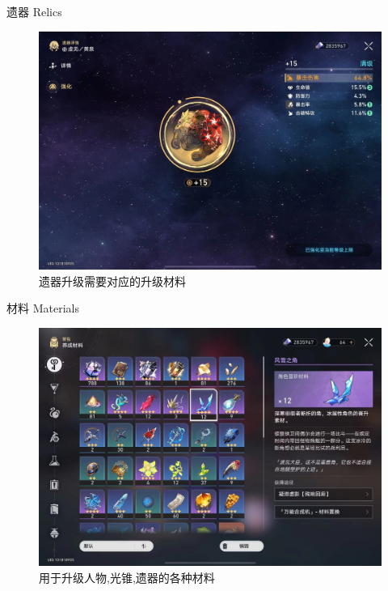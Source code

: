 \documentclass{beamer}
\begin{document}
\begin{frame}{遗器 Relics}
    \begin{figure}   
        \centering
        \includegraphics[width=0.8\linewidth]{img/e6e4bfd527b9df53ecc28ae6dd85f8c.jpg} 
        \caption{遗器升级需要对应的升级材料}
        \label{Forward and Reverse Process}
        \end{figure}
\end{frame}

\begin{frame}{材料 Materials }
    \begin{figure}   
        \centering
        \includegraphics[width=0.8\linewidth]{img/a215e476d58dc40630e6ce622285496.jpg} 
        \caption{用于升级人物,光锥,遗器的各种材料}
        \label{Forward and Reverse Process}
        \end{figure}
\end{frame}
\end{document}
